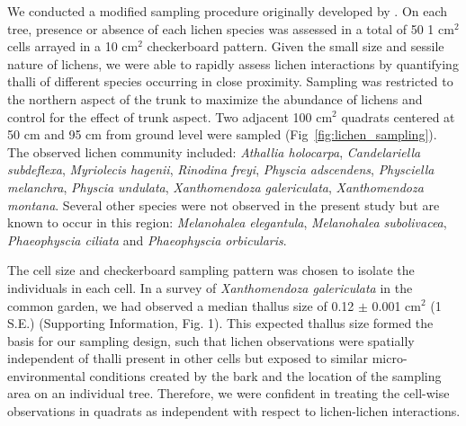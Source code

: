 \documentclass[fleqn,12pt]{olplainarticle}
\begin{document}
We conducted a modified sampling procedure originally developed by
\cite{Lamit2015a}. On each tree, presence or absence of each lichen
species was assessed in a total of 50 1 cm$^2$ cells arrayed in a 10
cm$^2$ checkerboard pattern. Given the small size and sessile nature
of lichens, we were able to rapidly assess lichen interactions by
quantifying thalli of different species occurring in close
proximity. Sampling was restricted to the northern aspect of the trunk
to maximize the abundance of lichens and control for the effect of
trunk aspect. Two adjacent 100 cm$^2$ quadrats centered at 50 cm and
95 cm from ground level were sampled
(Fig~\ref{fig:lichen_sampling}). The observed lichen community
included: \textit{Athallia holocarpa}, \textit{Candelariella
  subdeflexa}, \textit{Myriolecis hagenii}, \textit{Rinodina freyi},
\textit{Physcia adscendens}, \textit{Physciella melanchra},
\textit{Physcia undulata}, \textit{Xanthomendoza galericulata},
\textit{Xanthomendoza montana}. Several other species were not
observed in the present study but are known to occur in this region:
\textit{Melanohalea elegantula}, \textit{Melanohalea subolivacea},
\textit{Phaeophyscia ciliata} and \textit{Phaeophyscia orbicularis}.

The cell size and checkerboard sampling pattern was chosen to isolate
the individuals in each cell. In a survey of \textit{Xanthomendoza
  galericulata} in the common garden, we had observed a median thallus
size of 0.12 $\pm$ 0.001 cm$^2$ (1 S.E.)  (Supporting Information,
Fig. 1). This expected thallus size formed the basis for our sampling
design, such that lichen observations were spatially independent of
thalli present in other cells but exposed to similar
micro-environmental conditions created by the bark and the location of
the sampling area on an individual tree. Therefore, we were confident
in treating the cell-wise observations in quadrats as independent with
respect to lichen-lichen interactions. 
\end{document}
